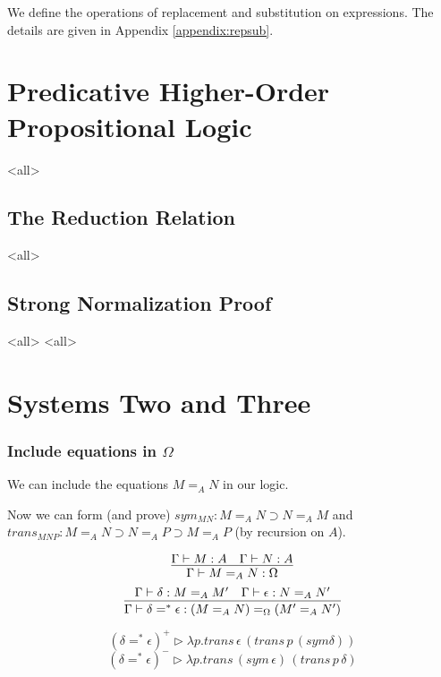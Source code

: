 We define the operations of replacement and substitution on
expressions.  The details are given in Appendix \ref{appendix:repsub}.








\section{Predicative Higher-Order Propositional Logic}


\mode<all>{}

\subsection{The Reduction Relation}

\mode<all>{}

\subsection{Strong Normalization Proof}

\mode<all>{}
\mode<all>{}

\section{Systems Two and Three}

\begin{frame}
\frametitle{Include equations in $\Omega$}

We can include the equations $M =_A N$ in our logic.

Now we can form (and prove) $sym_{MN} : M =_A N \supset N =_A M$ and $trans_{MNP} : M =_A N \supset N =_A P \supset M =_A P$ (by recursion on $A$).

\pause

\[ \infer{\Gamma \vdash M =_A N : \Omega}{\Gamma \vdash M : A \quad \Gamma \vdash N : A} \]
\[ \infer{\Gamma \vdash \delta =^* \epsilon : (M =_A N) =_\Omega (M' =_A N')}
{\Gamma \vdash \delta : M =_A M' \quad \Gamma \vdash \epsilon : N =_A N'} \]

\pause

\[ (\delta =^* \epsilon)^+ \rhd \lambda p. trans \, \epsilon \, (trans \, p \, (sym \delta)) \]
\[ (\delta =^* \epsilon)^- \rhd \lambda p. trans \, (sym \, \epsilon) \, (trans \, p \, \delta) \]
\end{frame}

